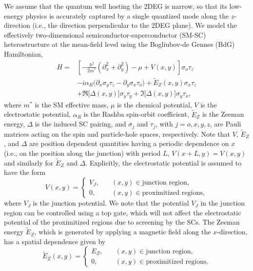 \documentclass[twocolumn,aps,prb,nofootinbib]{revtex4-2}
\begin{document}
We assume that the quantum well hosting the 2DEG is narrow, so that its low-energy physics is accurately captured by a single quantized mode along the $z$-direction (i.e., the direction perpendicular to the 2DEG plane). We model the effectively two-dimensional semiconductor-superconductor (SM-SC) heterostructure at the mean-field level using the Bogliubov-de Gennes (BdG) Hamiltonian,
\begin{equation}
\begin{split}
    H =& 
    \left[
    -\frac{h^2}{2 m^*}\left(\partial_x^2 + \partial_y^2\right)
    - \mu + V(x,y)
    \right]\sigma_o\tau_z  \\
    &-i \alpha_R \Big(\partial_x\sigma_y \tau_z
    - \partial_y\sigma_x\tau_o\Big)
    + \widetilde{E}_Z(x,y) \sigma_x \tau_z \\
    &+ \Re\Big[ \Delta(x,y)\Big] \sigma_y \tau_y + \Im\Big[\Delta(x,y)\Big] \sigma_y \tau_x,
\end{split} \label{HBdG}
\end{equation}
where $m^*$ is the SM effective mass, $\mu$ is the chemical potential, $V$ is the electrostatic potential, $\alpha_R$ is the Rashba spin-orbit coefficient, $\widetilde{E}_Z$ is the Zeeman energy, $\Delta$ is the induced SC pairing, and $\sigma_j$ and $\tau_j$, with $j = o, x, y, z$, are Pauli matrices acting on the spin and particle-hole spaces, respectively. Note that $V$, $\widetilde{E}_Z$, and $\Delta$ are position dependent quantities having a periodic dependence on $x$ (i.e., on the position along the junction) with period $L$, $V(x + L,y) = V(x,y)$ and similarly for $\widetilde{E}_Z$ and $\Delta$. Explicitly, the electrostatic potential is assumed to have the form
\begin{equation}
    V(x,y) = 
    \begin{cases}
    V_J,\quad&(x,y)\in\text{junction region}, \\
    0,\quad&(x,y)\in\text{proximitized regions},
    \end{cases} \label{Pot}
\end{equation}
where $V_J$ is the junction potential. We note that the potential $V_J$ in the junction region can be controlled using a top gate, which will not affect the electrostatic potential of the proximitized regions due to screening by the SCs. 
The Zeeman energy $\widetilde{E}_Z$, which is generated by applying a magnetic field along the $x$-direction, has a spatial dependence given by
\begin{equation}
    \widetilde{E}_Z(x,y) = 
    \begin{cases}
    E_Z,\quad&(x,y)\in\text{junction region}, \\
    0,\quad&(x,y)\in\text{proximitized regions}.
    \end{cases} \label{Zeeman}
\end{equation}
\end{document}
